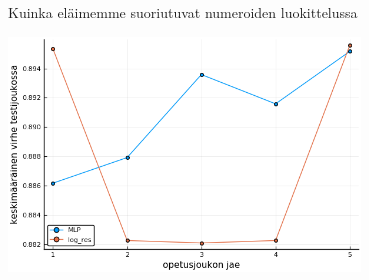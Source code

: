 \documentclass[presentation]{beamer}
\begin{document}
\begin{frame}{Kuinka eläimemme suoriutuvat numeroiden luokittelussa}

\includegraphics[width=0.7\textwidth]{mlp_logres.png}

\end{frame}
\end{document}
